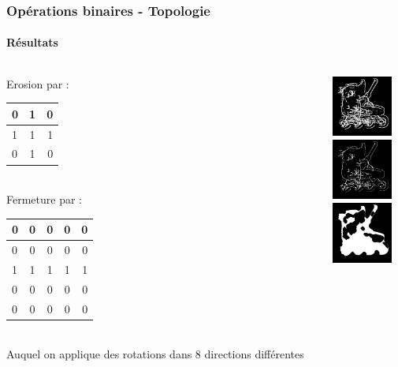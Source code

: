 \documentclass[french]{beamer}
\begin{document}
\begin{frame}
	\frametitle{Opérations binaires - Topologie}
	\framesubtitle{Résultats}
	\begin{columns}
		\begin{column}{5cm}
			Erosion par : \\
			\medskip
			\begin{tabular}{|l|c|r|}
				\hline
				0 & 1 & 0 \\ \hline
				1 & 1 & 1 \\ \hline
				0 & 1 & 0 \\
				\hline
			\end{tabular} \\
			\medskip
			Fermeture par : \\
			\medskip
			\begin{tabular}{|l|c|c|c|r|}
				\hline
				0 & 0 & 0 & 0 & 0 \\ \hline
				0 & 0 & 0 & 0 & 0 \\ \hline
				1 & 1 & 1 & 1 & 1 \\ \hline
				0 & 0 & 0 & 0 & 0 \\ \hline
				0 & 0 & 0 & 0 & 0 \\
				\hline
			\end{tabular} \\
			\medskip
			Auquel on applique des rotations dans 8 directions différentes
		\end{column}
		\begin{column}{5cm}
			\includegraphics[width=2cm]{images/roller_bin.jpg}\\
			\includegraphics[width=2cm]{images/roller_bin-.jpg}\\
			\includegraphics[width=2cm]{images/roller_closedbin.jpg}
		\end{column}
	\end{columns}
\end{frame}
\end{document}

